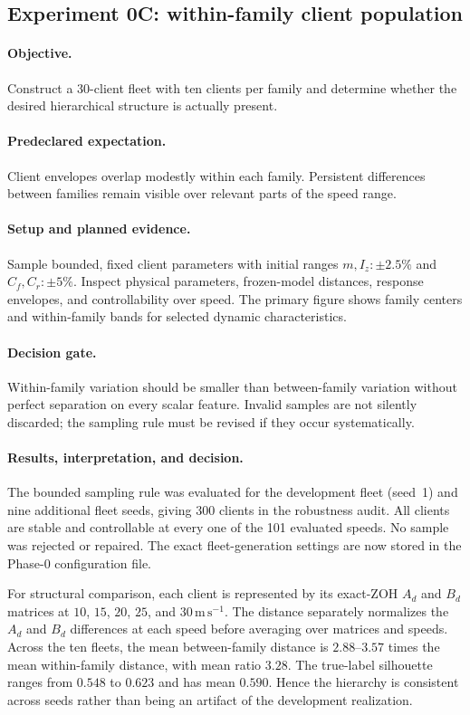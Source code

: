 \subsection{Experiment 0C: within-family client population}
\paragraph{Objective.}
Construct a 30-client fleet with ten clients per family and determine whether the
desired hierarchical structure is actually present.

\paragraph{Predeclared expectation.}
Client envelopes overlap modestly within each family. Persistent differences
between families remain visible over relevant parts of the speed range.

\paragraph{Setup and planned evidence.}
Sample bounded, fixed client parameters with initial ranges
$m,I_z:\pm2.5\%$ and $C_f,C_r:\pm5\%$. Inspect physical parameters, frozen-model
distances, response envelopes, and controllability over speed. The primary figure
shows family centers and within-family bands for selected dynamic characteristics.

\paragraph{Decision gate.}
Within-family variation should be smaller than between-family variation without
perfect separation on every scalar feature. Invalid samples are not silently
discarded; the sampling rule must be revised if they occur systematically.

\paragraph{Results, interpretation, and decision.}
The bounded sampling rule was evaluated for the development fleet (seed~1) and
nine additional fleet seeds, giving 300 clients in the robustness audit. All
clients are stable and controllable at every one of the 101 evaluated speeds. No
sample was rejected or repaired. The exact fleet-generation settings are now
stored in the Phase-0 configuration file.

For structural comparison, each client is represented by its exact-ZOH $A_d$ and
$B_d$ matrices at $10$, $15$, $20$, $25$, and
$30\,\mathrm{m\,s^{-1}}$. The distance separately normalizes the $A_d$ and $B_d$
differences at each speed before averaging over matrices and speeds. Across the ten
fleets, the mean between-family distance is $2.88$--$3.57$ times the mean
within-family distance, with mean ratio $3.28$. The true-label silhouette ranges
from $0.548$ to $0.623$ and has mean $0.590$. Hence the hierarchy is consistent
across seeds rather than being an artifact of the development realization.

